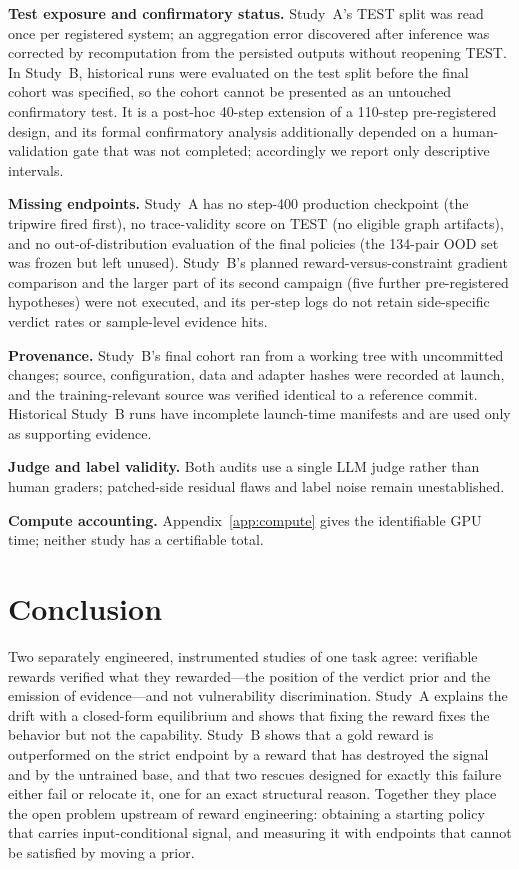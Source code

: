 \documentclass[journal]{IEEEtran}
\begin{document}
\textbf{Test exposure and confirmatory status.} Study~A's TEST split was read once per registered system; an aggregation error discovered after inference was corrected by recomputation from the persisted outputs without reopening TEST. In Study~B, historical runs were evaluated on the test split before the final cohort was specified, so the cohort cannot be presented as an untouched confirmatory test. It is a post-hoc 40-step extension of a 110-step pre-registered design, and its formal confirmatory analysis additionally depended on a human-validation gate that was not completed; accordingly we report only descriptive intervals.

\textbf{Missing endpoints.} Study~A has no step-400 production checkpoint (the tripwire fired first), no trace-validity score on TEST (no eligible graph artifacts), and no out-of-distribution evaluation of the final policies (the 134-pair OOD set was frozen but left unused). Study~B's planned reward-versus-constraint gradient comparison and the larger part of its second campaign (five further pre-registered hypotheses) were not executed, and its per-step logs do not retain side-specific verdict rates or sample-level evidence hits.

\textbf{Provenance.} Study~B's final cohort ran from a working tree with uncommitted changes; source, configuration, data and adapter hashes were recorded at launch, and the training-relevant source was verified identical to a reference commit. Historical Study~B runs have incomplete launch-time manifests and are used only as supporting evidence.

\textbf{Judge and label validity.} Both audits use a single LLM judge rather than human graders; patched-side residual flaws and label noise remain unestablished.

\textbf{Compute accounting.} Appendix~\ref{app:compute} gives the identifiable GPU time; neither study has a certifiable total.

\section{Conclusion}
Two separately engineered, instrumented studies of one task agree: verifiable rewards verified what they rewarded---the position of the verdict prior and the emission of evidence---and not vulnerability discrimination. Study~A explains the drift with a closed-form equilibrium and shows that fixing the reward fixes the behavior but not the capability. Study~B shows that a gold reward is outperformed on the strict endpoint by a reward that has destroyed the signal and by the untrained base, and that two rescues designed for exactly this failure either fail or relocate it, one for an exact structural reason. Together they place the open problem upstream of reward engineering: obtaining a starting policy that carries input-conditional signal, and measuring it with endpoints that cannot be satisfied by moving a prior.
\end{document}
